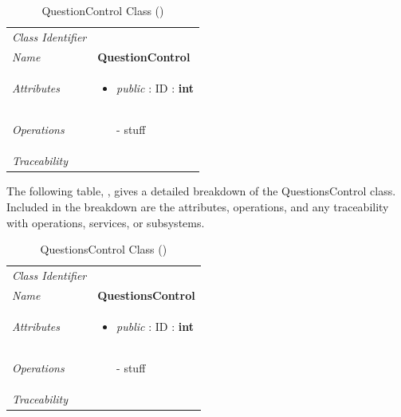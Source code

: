 \documentclass[12pt,letterpaper]{article}
\begin{document}
\begin{table}[H]
    \caption{QuestionControl Class ()} 
	\begin{tabu} to 
		\toprule
		Class Identifier &  \\
		Name & {\bf QuestionControl} \\
		Attributes & 
		\begin{minipage}[t]{\linewidth}
		    \begin{itemize}
		        \item \textit{public} : ID : \bf{int}
			\end{itemize}
	    \end{minipage} \\

		Operations &
		\begin{minipage}[t]{\linewidth}
			\begin{enumerate}
			    \item[-] stuff
	        \end{enumerate}
	    \end{minipage} \\
	    	Traceability & \\
		\toprule
	\end{tabu}
\end{table}

The following table, , gives a detailed breakdown of the QuestionsControl class. Included in the breakdown are the attributes, operations, and any traceability with operations, services, or subsystems.

\begin{table}[H]
    \caption{QuestionsControl Class ()} 
	\begin{tabu} to 
		\toprule
		Class Identifier &  \\
		Name & {\bf QuestionsControl} \\
		Attributes & 
		\begin{minipage}[t]{\linewidth}
		    \begin{itemize}
		        \item \textit{public} : ID : \bf{int}
			\end{itemize}
	    \end{minipage} \\

		Operations &
		\begin{minipage}[t]{\linewidth}
			\begin{enumerate}
			    \item[-] stuff
	        \end{enumerate}
	    \end{minipage} \\
	    	Traceability & \\
		\toprule
	\end{tabu}
\end{table}
\end{document}
